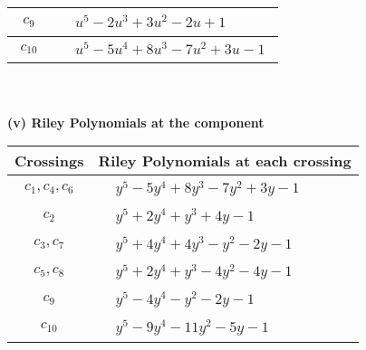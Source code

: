 \documentclass[1p]{elsarticle_modified}
\theoremstyle{definition}
\begin{document}
\begin{tabular}{m{50pt}|m{274pt}}
\hline $$\begin{aligned}c_{9}\end{aligned}$$&$\begin{aligned}
&u^5-2 u^3+3 u^2-2 u+1
\end{aligned}$\\
\hline $$\begin{aligned}c_{10}\end{aligned}$$&$\begin{aligned}
&u^5-5 u^4+8 u^3-7 u^2+3 u-1
\end{aligned}$\\
\hline
\end{tabular}\\~\\
\newpage\renewcommand{\arraystretch}{1}
\flushleft \textbf{(v) Riley Polynomials at the component}\newline \\
\begin{tabular}{m{50pt}|m{274pt}}
Crossings & \hspace{64pt}Riley Polynomials at each crossing \\
\hline $$\begin{aligned}c_{1},c_{4},c_{6}\end{aligned}$$&$\begin{aligned}
&y^5-5 y^4+8 y^3-7 y^2+3 y-1
\end{aligned}$\\
\hline $$\begin{aligned}c_{2}\end{aligned}$$&$\begin{aligned}
&y^5+2 y^4+y^3+4 y-1
\end{aligned}$\\
\hline $$\begin{aligned}c_{3},c_{7}\end{aligned}$$&$\begin{aligned}
&y^5+4 y^4+4 y^3- y^2-2 y-1
\end{aligned}$\\
\hline $$\begin{aligned}c_{5},c_{8}\end{aligned}$$&$\begin{aligned}
&y^5+2 y^4+y^3-4 y^2-4 y-1
\end{aligned}$\\
\hline $$\begin{aligned}c_{9}\end{aligned}$$&$\begin{aligned}
&y^5-4 y^4- y^2-2 y-1
\end{aligned}$\\
\hline $$\begin{aligned}c_{10}\end{aligned}$$&$\begin{aligned}
&y^5-9 y^4-11 y^2-5 y-1
\end{aligned}$\\
\hline
\end{tabular}\\~\\
\end{document}
